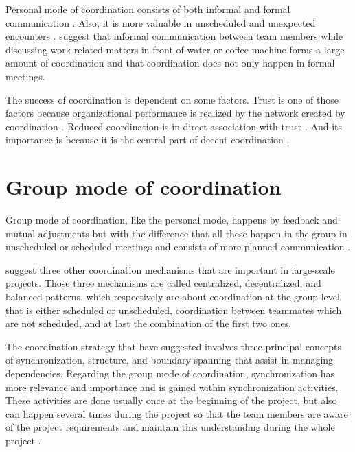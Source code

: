 Personal mode of coordination consists of both informal and formal communication \citep{Kraut1995a}. Also, it is more valuable in unscheduled and unexpected encounters \citep{Boos2011,Dickenson1997}. \citet{Kraut1995a} suggest that informal communication between team members while discussing work-related matters in front of water or coffee machine forms a large amount of coordination and that coordination does not only happen in formal meetings.

The success of coordination is dependent on some factors. Trust is one of those factors because organizational performance is realized by the network created by coordination \citep{DeJong2016}. Reduced coordination is in direct association with trust \citep{RoohullahJan2016}. And its importance is because it is the central part of decent coordination \citep{Osifo2012}. 

\section{Group mode of coordination}

Group mode of coordination, like the personal mode, happens by feedback and mutual adjustments but with the difference that all these happen in the group in unscheduled or scheduled meetings and consists of more planned communication \citep{VanDeVen1976}.

\citet{Dietrich2013} suggest three other coordination mechanisms that are important in large-scale projects. Those three mechanisms are called centralized, decentralized, and balanced patterns, which respectively are about coordination at the group level that is either scheduled or unscheduled, coordination between teammates which are not scheduled, and at last the combination of the first two ones.

The coordination strategy that \citet{Strode2012} have suggested involves three principal concepts of synchronization, structure, and boundary spanning that assist in managing dependencies. Regarding the group mode of coordination, synchronization has more relevance and importance and is gained within synchronization activities. These activities are done usually once at the beginning of the project, but also can happen several times during the project so that the team members are aware of the project requirements and maintain this understanding during the whole project \citep{Strode2012}.

